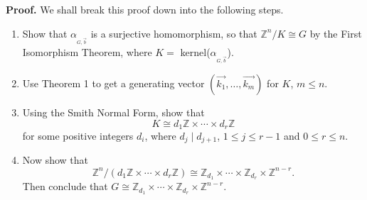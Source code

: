 \documentclass[9pt]{article}
\newcommand{\Z}{\mathbb{Z}}
\begin{document}
\noindent
\textbf{Proof.} We shall break this proof down into the following steps.

\begin{enumerate}
   \item Show that $\alpha_{_{G, \vec{b}}}$ is a surjective homomorphism, so that
         $\Z^n/K \cong G$ by the First Isomorphism Theorem, where
         $K = $ kernel($\alpha_{_{G, \vec{b}}}$).
   \item Use Theorem 1 to get a generating vector
         $(\vec{k_1}, \ldots, \vec{k_m})$ for $K$, $m \le n$.
   \item Using the Smith Normal Form, show that
         $$K \cong d_1\Z \times \cdots \times d_r\Z$$
         for some positive integers $d_i$, where
         $d_j \mid d_{j + 1}$, $1 \le j \le r - 1$ and $0 \le r \le n$.
   \item Now show that
         $$\Z^n/(d_1\Z \times \cdots \times d_r\Z) \cong \Z_{d_1} \times \cdots
           \times \Z_{d_r} \times \Z^{n-r}.$$
         Then conclude that $G \cong \Z_{d_1} \times \cdots
           \times \Z_{d_r} \times \Z^{n-r}$.         
\end{enumerate}
\end{document}
